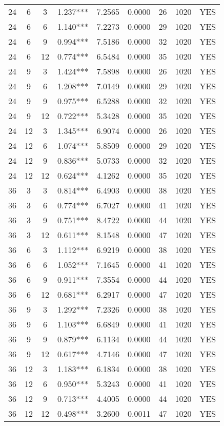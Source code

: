 \begin{table}[htbp]
\begin{tabular}{ccc|rrrcc|c}
24 & 6 & 3 & 1.237*** & 7.2565 & 0.0000 & 26 & 1020 & YES \\
24 & 6 & 6 & 1.140*** & 7.2273 & 0.0000 & 29 & 1020 & YES \\
24 & 6 & 9 & 0.994*** & 7.5186 & 0.0000 & 32 & 1020 & YES \\
24 & 6 & 12 & 0.774*** & 6.5484 & 0.0000 & 35 & 1020 & YES \\
24 & 9 & 3 & 1.424*** & 7.5898 & 0.0000 & 26 & 1020 & YES \\
24 & 9 & 6 & 1.208*** & 7.0149 & 0.0000 & 29 & 1020 & YES \\
24 & 9 & 9 & 0.975*** & 6.5288 & 0.0000 & 32 & 1020 & YES \\
24 & 9 & 12 & 0.722*** & 5.3428 & 0.0000 & 35 & 1020 & YES \\
24 & 12 & 3 & 1.345*** & 6.9074 & 0.0000 & 26 & 1020 & YES \\
24 & 12 & 6 & 1.074*** & 5.8509 & 0.0000 & 29 & 1020 & YES \\
24 & 12 & 9 & 0.836*** & 5.0733 & 0.0000 & 32 & 1020 & YES \\
24 & 12 & 12 & 0.624*** & 4.1262 & 0.0000 & 35 & 1020 & YES \\
36 & 3 & 3 & 0.814*** & 6.4903 & 0.0000 & 38 & 1020 & YES \\
36 & 3 & 6 & 0.774*** & 6.7027 & 0.0000 & 41 & 1020 & YES \\
36 & 3 & 9 & 0.751*** & 8.4722 & 0.0000 & 44 & 1020 & YES \\
36 & 3 & 12 & 0.611*** & 8.1548 & 0.0000 & 47 & 1020 & YES \\
36 & 6 & 3 & 1.112*** & 6.9219 & 0.0000 & 38 & 1020 & YES \\
36 & 6 & 6 & 1.052*** & 7.1645 & 0.0000 & 41 & 1020 & YES \\
36 & 6 & 9 & 0.911*** & 7.3554 & 0.0000 & 44 & 1020 & YES \\
36 & 6 & 12 & 0.681*** & 6.2917 & 0.0000 & 47 & 1020 & YES \\
36 & 9 & 3 & 1.292*** & 7.2326 & 0.0000 & 38 & 1020 & YES \\
36 & 9 & 6 & 1.103*** & 6.6849 & 0.0000 & 41 & 1020 & YES \\
36 & 9 & 9 & 0.879*** & 6.1134 & 0.0000 & 44 & 1020 & YES \\
36 & 9 & 12 & 0.617*** & 4.7146 & 0.0000 & 47 & 1020 & YES \\
36 & 12 & 3 & 1.183*** & 6.1834 & 0.0000 & 38 & 1020 & YES \\
36 & 12 & 6 & 0.950*** & 5.3243 & 0.0000 & 41 & 1020 & YES \\
36 & 12 & 9 & 0.713*** & 4.4005 & 0.0000 & 44 & 1020 & YES \\
36 & 12 & 12 & 0.498*** & 3.2600 & 0.0011 & 47 & 1020 & YES \\
\bottomrule
\end{tabular}
\end{table}
